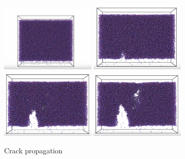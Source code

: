 \begin{figure}
    \centering
    \noindent
\includegraphics[width=0.4\textwidth]{picture/frac_prop1.PNG}\hspace{0.2\textwidth}%
\includegraphics[width=0.4\textwidth]{picture/frac_prop2.PNG}\\[2em]
\includegraphics[width=0.4\textwidth]{picture/frac_prop3.PNG}\hspace{0.2\textwidth}%
\includegraphics[width=0.4\textwidth]{picture/frac_prop4.PNG}\par

    \caption{Crack propagation}
    \label{crack_prop}
\end{figure}


